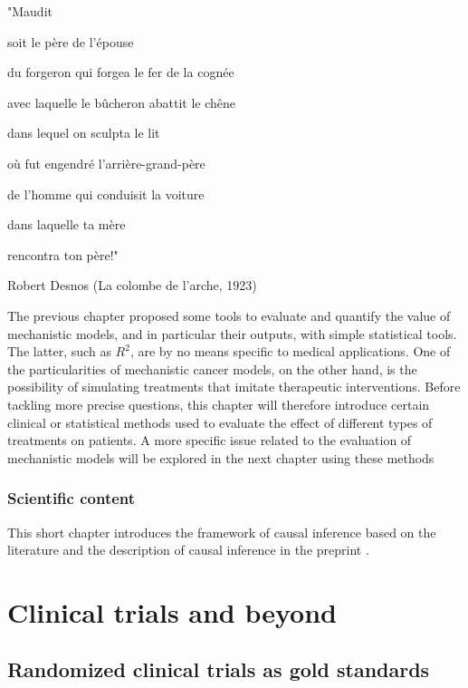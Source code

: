 \documentclass[a4paper,12pt,twoside,onecolumn,openright,final,oldfontcommands]{memoir}
\newcommand{\initial}[1]{
	\lettrine[lines=3,lhang=0.33,nindent=0em]{
		\color{gray}
     		{\textsc{#1}}}{}}
\let\BeginKnitrBlock\begin \let\EndKnitrBlock\end
\begin{document}
\epigraph{"Maudit

soit le père de l'épouse

du forgeron qui forgea le fer de la cognée

avec laquelle le bûcheron abattit le chêne

dans lequel on sculpta le lit

où fut engendré l'arrière-grand-père

de l'homme qui conduisit la voiture

dans laquelle ta mère

rencontra ton père!"}{Robert Desnos (La colombe de l'arche, 1923)}

\initial{T}he previous chapter proposed some tools to evaluate and
quantify the value of mechanistic models, and in particular their
outputs, with simple statistical tools. The latter, such as \(R^2\), are
by no means specific to medical applications. One of the particularities
of mechanistic cancer models, on the other hand, is the possibility of
simulating treatments that imitate therapeutic interventions. Before
tackling more precise questions, this chapter will therefore introduce
certain clinical or statistical methods used to evaluate the effect of
different types of treatments on patients. A more specific issue related
to the evaluation of mechanistic models will be explored in the next
chapter using these methods

\BeginKnitrBlock{summarybox}
\subsubsection*{Scientific content}\label{scientific-content-5}

This short chapter introduces the framework of causal inference based on
the literature and the description of causal inference in the preprint
\citet{beal2020causal}.
\EndKnitrBlock{summarybox}

\newcommand{\indep}{\perp \!\!\! \perp}

\section{Clinical trials and beyond}\label{clinical-trials-and-beyond}

\subsection{Randomized clinical trials as gold
standards}\label{randomized-clinical-trials-as-gold-standards}
\end{document}
